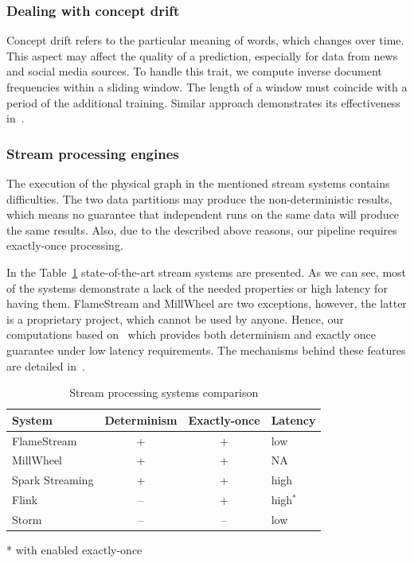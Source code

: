 \subsubsection{Dealing with concept drift}

Concept drift refers to the particular meaning of words, which changes over time. This aspect may affect the quality of a prediction, especially for data from news and social media sources. To handle this trait, we compute inverse document frequencies within a sliding window. The length of a window must coincide with a period of the additional training. Similar approach demonstrates its effectiveness in~\cite{klinkenberg2000detecting}.

\subsubsection{Stream processing engines}

The execution of the physical graph in the mentioned stream systems contains difficulties. The two data partitions may produce the non-deterministic results, which means no guarantee that independent runs on the same data will produce the same results. Also, due to the described above reasons, our pipeline requires exactly-once processing. 

In the Table~\ref{comparison} state-of-the-art stream systems are presented. As we can see, most of the systems demonstrate a lack of the needed properties or high latency for having them. FlameStream and MillWheel are two exceptions, however, the latter is a proprietary project, which cannot be used by anyone. Hence, our computations based on \FlameStream\, which provides both determinism and exactly once guarantee under low latency requirements. The mechanisms behind these features are detailed in~\cite{we2018adbis, we2018beyondmr}.

\begin{table}[htbp]

\begin{threeparttable}
\begin{tabular}{lccl}

System             & Determinism & Exactly-once & Latency    \\
\hline
FlameStream        &      +     &    +    &   low            \\
MillWheel          &      +     &    +    &   NA             \\
Spark Streaming    &      +     &    +    &   high           \\
Flink              &      --     &    +    &   high$^*$       \\
Storm              &      --     &    --    &   low            \\

\end{tabular}

* with enabled exactly-once

\end{threeparttable}

\caption{Stream processing systems comparison}
\label{comparison}
\end{table}

